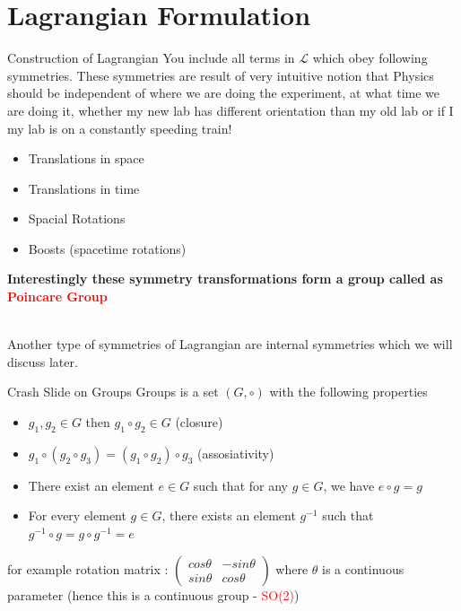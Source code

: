 \documentclass{beamer}
\begin{document}
\section{Lagrangian Formulation}
\begin{frame}{Construction of Lagrangian}
You include all terms in $\mathcal{L}$ which obey following symmetries. These symmetries are result of very intuitive notion that Physics should be independent of where we are doing the experiment, at what time we are doing it, whether my new lab has different orientation than my old lab or if I my lab is on a constantly speeding train!
\vspace{5mm}
\begin{itemize}
    \item Translations in space
    \item Translations in time
    \item Spacial Rotations
    \item Boosts (spacetime rotations)
\end{itemize} 
\vspace{5mm}
\begin{centre}
\textbf{Interestingly these symmetry transformations form a group called as \textcolor{red}{Poincare Group}}
\end{centre} \\
Another type of symmetries of Lagrangian are internal symmetries which we will discuss later.
\end{frame}
\begin{frame}{Crash Slide on Groups}
Groups is a set $(G, \circ)$ with the following properties
\begin{itemize}
    \item $g_{1}, g_{2} \in G$ then $g_{1}\circ g_{2} \in G$ (closure)
    \item $g_{1}\circ(g_{2}\circ g_{3}) = (g_{1}\circ g_{2})\circ g_{3}$ (assosiativity)
    \item There exist an element $e\in G$ such that for any $g \in G$, we have $e\circ g = g$
    \item For every element $g\in G$, there exists an element $g^{-1}$ such that $g^{-1}\circ g = g\circ g^{-1}=e$
\end{itemize} 
\vspace{5mm}
for example rotation matrix : 
$\begin{pmatrix}
cos\theta & -sin\theta\\
sin\theta & cos\theta
\end{pmatrix}$ 
where $\theta$ is a continuous parameter (hence this is a continuous group - \textcolor{red}{SO(2)})
\end{frame}
\end{document}
